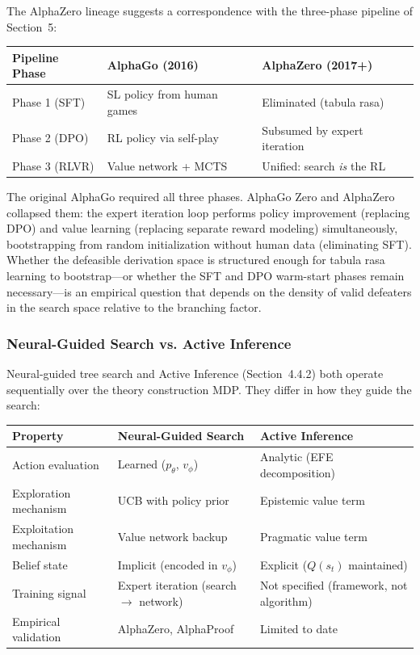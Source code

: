 \documentclass[11pt]{article}
\begin{document}
The AlphaZero lineage suggests a correspondence with the three-phase pipeline of Section~5:

\begin{center}
\small
\begin{tabular}{@{}lll@{}}
\toprule
Pipeline Phase & AlphaGo (2016) & AlphaZero (2017+) \\
\midrule
Phase 1 (SFT) & SL policy from human games & Eliminated (tabula rasa) \\
Phase 2 (DPO) & RL policy via self-play & Subsumed by expert iteration \\
Phase 3 (RLVR) & Value network + MCTS & Unified: search \emph{is} the RL \\
\bottomrule
\end{tabular}
\end{center}

The original AlphaGo required all three phases. AlphaGo Zero and AlphaZero collapsed them: the expert iteration loop performs policy improvement (replacing DPO) and value learning (replacing separate reward modeling) simultaneously, bootstrapping from random initialization without human data (eliminating SFT). Whether the defeasible derivation space is structured enough for tabula rasa learning to bootstrap---or whether the SFT and DPO warm-start phases remain necessary---is an empirical question that depends on the density of valid defeaters in the search space relative to the branching factor.

\subsubsection{Neural-Guided Search vs. Active Inference}

Neural-guided tree search and Active Inference (Section~4.4.2) both operate sequentially over the theory construction MDP. They differ in how they guide the search:

\begin{center}
\small
\begin{tabular}{@{}lll@{}}
\toprule
Property & Neural-Guided Search & Active Inference \\
\midrule
Action evaluation & Learned ($p_\theta$, $v_\phi$) & Analytic (EFE decomposition) \\
Exploration mechanism & UCB with policy prior & Epistemic value term \\
Exploitation mechanism & Value network backup & Pragmatic value term \\
Belief state & Implicit (encoded in $v_\phi$) & Explicit ($Q(s_t)$ maintained) \\
Training signal & Expert iteration (search $\to$ network) & Not specified (framework, not algorithm) \\
Empirical validation & AlphaZero, AlphaProof & Limited to date \\
\bottomrule
\end{tabular}
\end{center}
\end{document}
